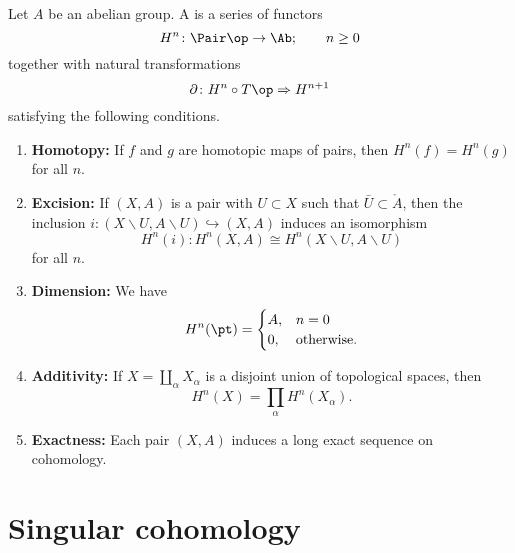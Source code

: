 \documentclass[main.tex]{subfiles}
\begin{document}
\begin{definition}
  \label{def:cohomology_theory}
  Let $A$ be an abelian group. A  is a series of functors
  \begin{equation*}
    H^{n}\colon \Pair\op \to \Ab;\qquad n \geq 0
  \end{equation*}
  together with natural transformations
  \begin{equation*}
    \partial\colon H^{n} \circ T\op \Rightarrow H^{n+1}
  \end{equation*}
  satisfying the following conditions.
  \begin{enumerate}
    \item \textbf{Homotopy:} If $f$ and $g$ are homotopic maps of pairs, then $H^{n}(f) = H^{n}(g)$ for all $n$.

    \item \textbf{Excision:} If $(X, A)$ is a pair with $U \subset X$ such that $\bar{U} \subset \mathring{A}$, then the inclusion $i\colon (X\smallsetminus U, A \smallsetminus U) \hookrightarrow (X, A)$ induces an isomorphism
      \begin{equation*}
        H^{n}(i)\colon H^{n}(X, A) \cong H^{n}(X \smallsetminus U, A \smallsetminus U)
      \end{equation*}
      for all $n$.

    \item \textbf{Dimension:} We have
      \begin{equation*}
        H^{n}(\pt) =
        \begin{cases}
          A, &n = 0 \\
          0, &\text{otherwise}.
        \end{cases}
      \end{equation*}

    \item \textbf{Additivity:} If $X = \coprod_{\alpha} X_{\alpha}$ is a disjoint union of topological spaces, then
      \begin{equation*}
        H^{n}(X) = \prod_{\alpha} H^{n}(X_{\alpha}).
      \end{equation*}

    \item \textbf{Exactness:} Each pair $(X, A)$ induces a long exact sequence on cohomology.
  \end{enumerate}
\end{definition}

\section{Singular cohomology}
\label{sec:singular_cohomology}
\end{document}
